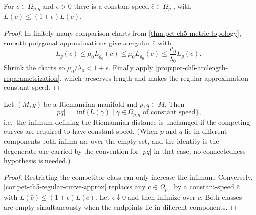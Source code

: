 \begin{corollary}
  \label{cor:pet-ch5-regular-curve-approx}
  \leanok
  For $c\in\Omega_{p,q}$ and $\epsilon>0$ there is a constant-speed
  $\bar c\in\Omega_{p,q}$ with $L(\bar c)\le(1+\epsilon)L(c)$.
\end{corollary}
\begin{proof}
  \leanok
  \sketch
  In finitely many comparison charts from \cref{thm:pet-ch5-metric-topology},
  smooth polygonal approximations give a regular $\bar c$ with
  \[
    L_g(\bar c)\le\mu_0L_{g_0}(\bar c)\le\mu_0L_{g_0}(c)\le\frac{\mu_0}{\lambda_0}L_g(c).
  \]
  Shrink the charts so $\mu_0/\lambda_0<1+\epsilon$.  Finally apply
  \cref{prop:pet-ch5-arclength-reparametrization}, which preserves length and makes
  the regular approximation constant speed.
\end{proof}

\begin{lemma}
  \label{lem:pet-ch5-constant-speed-distance}
  \leanok
  Let $(M,g)$ be a Riemannian manifold and $p,q\in M$. Then
  \[
    |pq|=\inf\{L(\gamma)\mid\gamma\in\Omega_{p,q}\text{ of constant speed}\},
  \]
  i.e.\ the infimum defining the Riemannian distance is unchanged if the competing
  curves are required to have constant speed. (When $p$ and $q$ lie in different
  components both infima are over the empty set, and the identity is the
  degenerate one carried by the convention for $|pq|$ in that case; no
  connectedness hypothesis is needed.)
\end{lemma}
\begin{proof}
  \leanok
  \sketch
  Restricting the competitor class can only increase the infimum.  Conversely,
  \cref{cor:pet-ch5-regular-curve-approx} replaces any $c\in\Omega_{p,q}$ by a
  constant-speed $\bar c$ with $L(\bar c)\le(1+\epsilon)L(c)$.  Let
  $\epsilon\downarrow0$ and then infimize over $c$.  Both classes are empty
  simultaneously when the endpoints lie in different components.
\end{proof}

